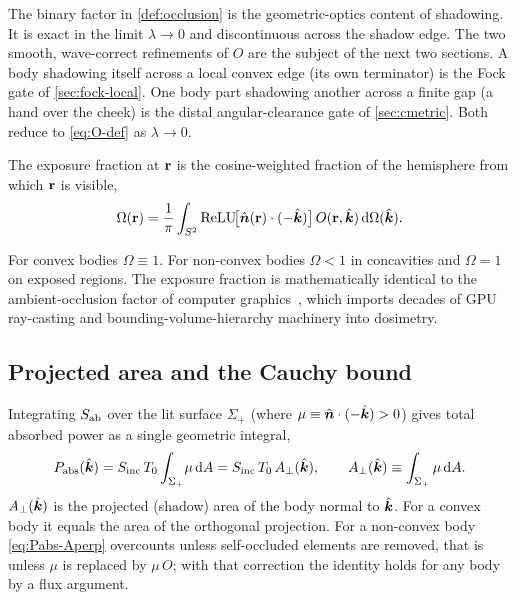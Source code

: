 The binary factor in \cref{def:occlusion} is the geometric-optics content of
shadowing. It is exact in the limit $\lambda\to 0$ and discontinuous across the
shadow edge. The two smooth, wave-correct refinements of $O$ are the subject of
the next two sections. A body shadowing itself across a local convex edge (its
own terminator) is the Fock gate of \cref{sec:fock-local}. One body part
shadowing another across a finite gap (a hand over the cheek) is the distal
angular-clearance gate of \cref{sec:cmetric}. Both reduce to \cref{eq:O-def} as
$\lambda\to 0$.

\begin{definition}\label{def:exposure-frac}
The exposure fraction at $\mathbf{r}$ is the cosine-weighted fraction of the hemisphere
from which $\mathbf{r}$ is visible,
\begin{equation}\label{eq:exposure-frac-def}
  \Omega(\mathbf{r}) = \frac{1}{\pi}\int_{S^2}
  \operatorname{ReLU}\!\bigl[\hat{\bm{n}}(\mathbf{r})\cdot(-\hat{\bm{k}})\bigr]\,O(\mathbf{r},\hat{\bm{k}})\,\mathrm{d}\Omega(\hat{\bm{k}}).
\end{equation}
\end{definition}

For convex bodies $\Omega\equiv 1$. For non-convex bodies $\Omega<1$ in concavities
and $\Omega=1$ on exposed regions. The exposure fraction is mathematically
identical to the ambient-occlusion factor of computer
graphics~\cite{Zhukov1998}, which imports decades of GPU ray-casting and
bounding-volume-hierarchy machinery into dosimetry.

\subsection{Projected area and the Cauchy bound}\label{sec:geom-cauchy}

Integrating $S_{\mathrm{ab}}$ over the lit surface $\Sigma_+$ (where
$\mu\equiv\hat{\bm{n}}\cdot(-\hat{\bm{k}})>0$) gives total absorbed power as a single geometric
integral,
\begin{equation}\label{eq:Pabs-Aperp}
  P_{\mathrm{abs}}(\hat{\bm{k}}) = S_{\mathrm{inc}}\,T_0\int_{\Sigma_+}\!\mu\,\mathrm{d} A
  = S_{\mathrm{inc}}\,T_0\,A_{\perp}(\hat{\bm{k}}),
  \qquad
  A_{\perp}(\hat{\bm{k}}) \equiv \int_{\Sigma_+}\mu\,\mathrm{d} A .
\end{equation}
$A_{\perp}(\hat{\bm{k}})$ is the projected (shadow) area of the body normal to $\hat{\bm{k}}$. For
a convex body it equals the area of the orthogonal projection. For a non-convex
body \cref{eq:Pabs-Aperp} overcounts unless self-occluded elements are removed,
that is unless $\mu$ is replaced by $\mu\,O$; with that correction the identity
holds for any body by a flux argument.

